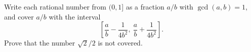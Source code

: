 Write each rational number from $(0, 1]$ as a fraction $a/b$ with $\gcd(a, b) = 1$, and cover $a/b$ with the interval
\[ \left[\frac{a}{b} - \frac{1}{4b^2},\ \frac{a}{b} + \frac{1}{4b^2}\right]. \]
Prove that the number $\sqrt{2}/2$ is not covered.
